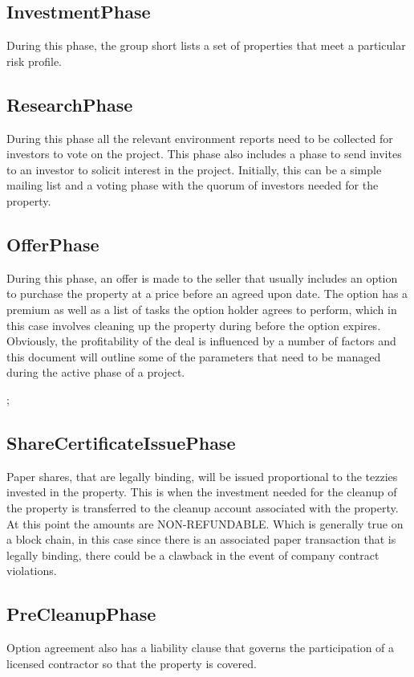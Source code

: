 \documentclass{article}
\begin{document}
\subsection{InvestmentPhase}
  During this phase, the group short lists a set of properties that meet a particular risk profile. 

\subsection{ResearchPhase}

  During this phase all the relevant environment reports need to be collected for investors to vote on the project. This phase also includes a phase to send invites to an investor to solicit interest in the project. Initially, 
  this can be a simple mailing list and a voting phase with the quorum of investors needed for the property.

\subsection{OfferPhase}

  During this phase, an offer is made to the seller that usually includes an option to purchase the property at a price before an agreed upon date. The option has a premium as well as a list of tasks the option holder agrees to perform, which in this case involves cleaning up the property during before the option expires. Obviously, the profitability of the deal is influenced by a number of factors and this document will outline some of the parameters that need to be managed during the active phase of a project.

;  \subsection{ShareCertificateIssuePhase}

  Paper shares, that are legally binding, will be issued proportional to the tezzies invested 
  in the property. This is when the investment needed for the cleanup of the property is transferred to the cleanup account associated with the property. At this point the amounts are NON-REFUNDABLE. Which is generally true on a block chain, in this case since there is an associated paper transaction that is legally binding, there could be a clawback in the event of company contract violations.

  \subsection{PreCleanupPhase}
  Option agreement also has a liability clause that governs the participation of a licensed contractor so that the property is covered. 
\end{document}
